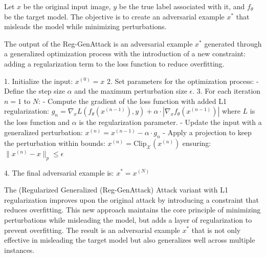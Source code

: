 Let $x$ be the original input image, $y$ be the true label associated with it, and $f_{\theta}$ be the target model. The objective is to create an adversarial example $x^*$ that misleads the model while minimizing perturbations.

The output of the Reg-GenAttack is an adversarial example $x^*$ generated through a generalized optimization process with the introduction of a new constraint: adding a regularization term to the loss function to reduce overfitting.

1. Initialize the input:
   $x^{(0)} = x$
2. Set parameters for the optimization process:
   - Define the step size $\alpha$ and the maximum perturbation size $\epsilon$.
3. For each iteration $n = 1$ to $N$:
   - Compute the gradient of the loss function with added L1 regularization:
   $g_n = \nabla_x L(f_{\theta}(x^{(n-1)}), y) + \alpha \cdot |\nabla_x f_{\theta}(x^{(n-1)})|$
   where $L$ is the loss function and $\alpha$ is the regularization parameter.
   - Update the input with a generalized perturbation:
   $x^{(n)} = x^{(n-1)} - \alpha \cdot g_n$
   - Apply a projection to keep the perturbation within bounds:
   $x^{(n)} = \text{Clip}_{\mathcal{X}}(x^{(n)})$
   ensuring:
   $\|x^{(n)} - x\|_p \leq \epsilon$

4. The final adversarial example is:
   $x^* = x^{(N)}$

The (Regularized Generalized (Reg-GenAttack) Attack variant with L1 regularization improves upon the original attack by introducing a constraint that reduces overfitting. This new approach maintains the core principle of minimizing perturbations while misleading the model, but adds a layer of regularization to prevent overfitting. The result is an adversarial example $x^*$ that is not only effective in misleading the target model but also generalizes well across multiple instances.